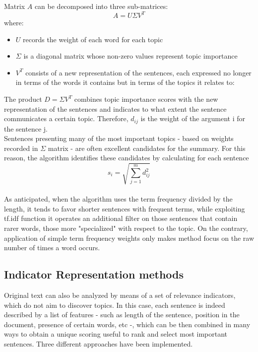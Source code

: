 \documentclass[fleqn,10pt]{SelfArx} %
\begin{document}
Matrix $A$ can be decomposed into three sub-matrices:
$$A=U\Sigma V^T$$
where:
\begin{itemize}
    \item $U$ records the weight of each word for each topic
    \item $\Sigma$ is a diagonal matrix whose non-zero values represent topic importance
    \item $V^T$ consists of a new representation of the sentences, each expressed no longer in terms of the words it contains but in terms of the topics it relates to:
\end{itemize}
The product $D=\Sigma V^T$ combines topic importance scores with the new representation of the sentences and indicates to what extent the sentence communicates a certain topic. Therefore, $d_{ij}$ is the weight of the argument i for the sentence j.\\
Sentences presenting many of the most important topics - based on weights recorded in $\Sigma$ matrix - are often excellent candidates for the summary. For this reason, the algorithm identifies these candidates by calculating for each sentence  $$s_i=\sqrt{\sum_{j=1}^md^2_{ij}}$$
\\
As anticipated, when the algorithm uses the term frequency divided by the length, it tends to favor shorter sentences with frequent terms, while exploiting tf.idf function it operates an additional filter on those sentences that contain rarer words, those more "specialized" with respect to the topic. On the contrary, application of simple term frequency weights only makes method focus on the raw number of times a word occurs.
\subsection{Indicator Representation methods}
Original text can also be analyzed by means of a set of relevance indicators, which do not aim to discover topics. In this case, each sentence is indeed described by a list of features - such as length of the sentence, position in the document, presence of certain words, etc -, which can be then combined in many ways to obtain a unique scoring useful to rank and select most important sentences. Three different approaches have been implemented.
\end{document}
